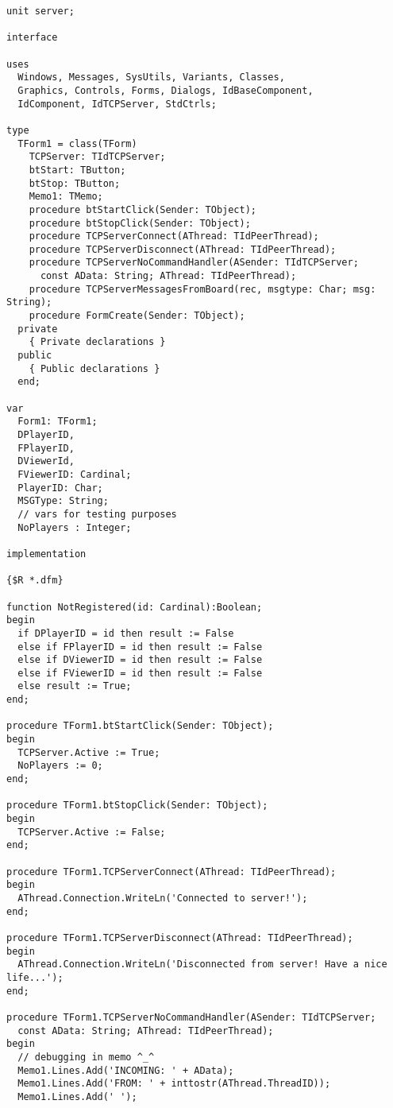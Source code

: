 \documentclass{article}
\begin{document}
\lstset{language=Pascal}

\begin{lstlisting}[basicstyle=\footnotesize]  
unit server;

interface

uses
  Windows, Messages, SysUtils, Variants, Classes,
  Graphics, Controls, Forms, Dialogs, IdBaseComponent,
  IdComponent, IdTCPServer, StdCtrls;

type
  TForm1 = class(TForm)
    TCPServer: TIdTCPServer;
    btStart: TButton;
    btStop: TButton;
    Memo1: TMemo;
    procedure btStartClick(Sender: TObject);
    procedure btStopClick(Sender: TObject);
    procedure TCPServerConnect(AThread: TIdPeerThread);
    procedure TCPServerDisconnect(AThread: TIdPeerThread);
    procedure TCPServerNoCommandHandler(ASender: TIdTCPServer;
      const AData: String; AThread: TIdPeerThread);
    procedure TCPServerMessagesFromBoard(rec, msgtype: Char; msg: String);
    procedure FormCreate(Sender: TObject);
  private
    { Private declarations }
  public
    { Public declarations }
  end;

var
  Form1: TForm1;
  DPlayerID,
  FPlayerID,
  DViewerId,
  FViewerID: Cardinal;
  PlayerID: Char;
  MSGType: String;
  // vars for testing purposes
  NoPlayers : Integer;

implementation

{$R *.dfm}

function NotRegistered(id: Cardinal):Boolean;
begin
  if DPlayerID = id then result := False
  else if FPlayerID = id then result := False
  else if DViewerID = id then result := False
  else if FViewerID = id then result := False
  else result := True;
end;

procedure TForm1.btStartClick(Sender: TObject);
begin
  TCPServer.Active := True;
  NoPlayers := 0;
end;

procedure TForm1.btStopClick(Sender: TObject);
begin
  TCPServer.Active := False;
end;

procedure TForm1.TCPServerConnect(AThread: TIdPeerThread);
begin
  AThread.Connection.WriteLn('Connected to server!');
end;

procedure TForm1.TCPServerDisconnect(AThread: TIdPeerThread);
begin
  AThread.Connection.WriteLn('Disconnected from server! Have a nice life...');
end;

procedure TForm1.TCPServerNoCommandHandler(ASender: TIdTCPServer;
  const AData: String; AThread: TIdPeerThread);
begin
  // debugging in memo ^_^
  Memo1.Lines.Add('INCOMING: ' + AData);
  Memo1.Lines.Add('FROM: ' + inttostr(AThread.ThreadID));
  Memo1.Lines.Add(' ');


\end{lstlisting}
\end{document}
